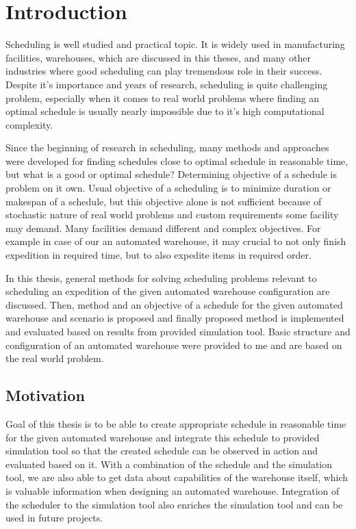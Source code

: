 \documentclass{ctuthesis}
\begin{document}
\maketitle

\chapter{Introduction}

Scheduling is well studied and practical topic. It is widely used in manufacturing facilities, warehouses, which are discussed in this theses, and many other industries where good scheduling can play tremendous role in their success. Despite it's importance and years of research, scheduling is quite challenging problem, especially when it comes to real world problems where finding an optimal schedule is usually nearly impossible due to it's high computational complexity. 

Since the beginning of research in scheduling, many methods and approaches were developed for finding schedules close to optimal schedule in reasonable time, but what is a good or optimal schedule? Determining objective of a schedule is problem on it own. Usual objective of a scheduling is to minimize duration or makespan of a schedule, but this objective alone is not sufficient because of stochastic nature of real world problems and custom requirements some facility may demand. Many facilities demand different and complex objectives. For example in case of our an automated warehouse, it may crucial to not only finish expedition in required time, but to also expedite items in required order. 

In this thesis, general methods for solving scheduling problems relevant to scheduling an expedition of the given automated warehouse configuration are discussed. Then, method and an objective of a schedule for the given automated warehouse and scenario is proposed and finally proposed method is implemented and evaluated based on results from provided simulation tool. Basic structure and configuration of an automated warehouse were provided to me and are based on the real world problem.

\section{Motivation}

Goal of this thesis is to be able to create appropriate schedule in reasonable time for the given automated warehouse and integrate this schedule to provided simulation tool so that the created schedule can be observed in action and evaluated based on it. With a combination of the schedule and the simulation tool, we are also able to get data about capabilities of the warehouse itself, which is valuable information when designing an automated warehouse. Integration of the scheduler to the simulation tool also enriches the simulation tool and can be used in future projects.
\end{document}
